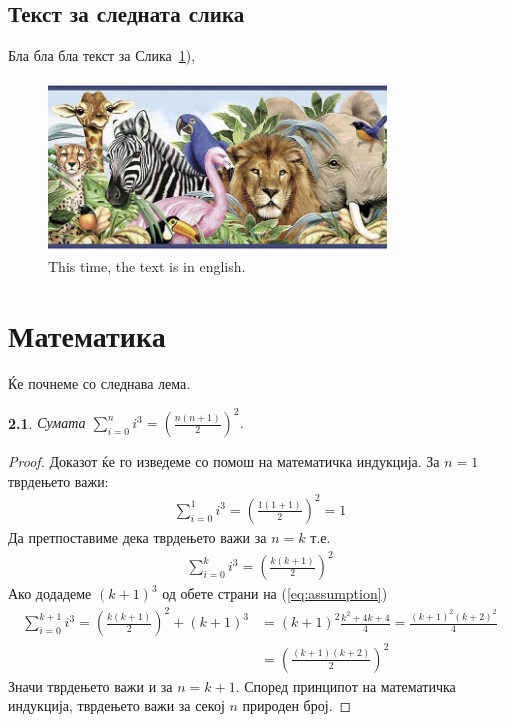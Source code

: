 \documentclass[a4paper]{report}
\newtheorem{lemma}[theorem]{\cyr \CYRL\cyre\cyrm\cyra}
\begin{document}
\section{Текст за следната слика}\label{something}
Бла бла бла текст за Слика~\ref{fig:bunchOfAnimals}), 
\begin{figure}[h!tb]
\centering
\includegraphics[width=0.8\textwidth]{images/animals}
\caption{This time, the text is in english.}
\label{fig:bunchOfAnimals}
\end{figure}

\chapter{Математика}
Ќе почнеме со следнава лема.
\begin{lemma} Сумата $\displaystyle\sum\limits_{i=0}^n i^3  = (\frac{n(n+1)}{2})^2$.
\end{lemma}
\begin{proof}
Доказот ќе го изведеме со помош на математичка индукција. За $n=1$ тврдењето важи:
\begin{align*}
\displaystyle\sum\limits_{i=0}^1 i^3  = (\frac{1(1+1)}{2})^2 = 1
\end{align*}
Да претпоставиме дека тврдењето важи за $n=k$ т.е. 
\begin{align}
\displaystyle\sum\limits_{i=0}^k i^3  = (\frac{k(k+1)}{2})^2 \label{eq:assumption}
\end{align}
Ако додадеме $(k+1)^3$ од обете страни на (\ref{eq:assumption})
\begin{align*}
\displaystyle\sum\limits_{i=0}^{k+1} i^3  = (\frac{k(k+1)}{2})^2 + (k+1)^3 &= (k+1)^2\frac{k^2 + 4k + 4}{4} = \frac{(k+1)^2(k+2)^2}{4}\\
& = (\frac{(k+1)(k+2)}{2})^2
\end{align*}
Значи тврдењето важи и за $n=k+1$. Според принципот на математичка индукција, тврдењето важи за секој $n$ природен број.
\end{proof}
\end{document}

